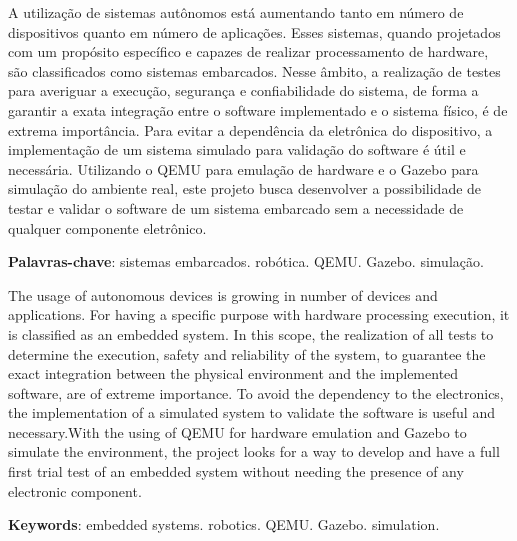\documentclass[../monografia.tex]{subfiles}
\begin{document}
    \clearpage

    {\centering   
    }
     A utilização de sistemas autônomos está aumentando tanto em número de dispositivos quanto em número de aplicações. Esses sistemas, quando projetados com um propósito específico e capazes de realizar processamento de hardware, são classificados como sistemas embarcados. Nesse âmbito, a realização de testes para averiguar a execução, segurança e confiabilidade do sistema, de forma a garantir a exata integração entre o software implementado e o sistema físico, é de extrema importância. Para evitar a dependência da eletrônica do dispositivo, a implementação de um sistema simulado para validação do software é útil e necessária. Utilizando o QEMU para emulação de hardware e o Gazebo para simulação do ambiente real, este projeto busca desenvolver a possibilidade de testar e validar o software de um sistema embarcado sem a necessidade de qualquer componente eletrônico.
    
     \textbf{Palavras-chave}: sistemas embarcados. robótica. QEMU. Gazebo. simulação.
        
    \clearpage
    
    {\centering   
    }
    \hspace{1cm} The usage of autonomous devices is growing in number of devices and applications. For having a specific purpose with hardware processing execution, it is classified as an embedded system. In this scope, the realization of all tests to determine the execution, safety and reliability of the system, to guarantee the exact integration between the physical environment  and the implemented software, are of extreme importance. To avoid the dependency to the electronics, the implementation of a simulated system to validate the software is useful and necessary.With the using of QEMU for hardware emulation and Gazebo to simulate the environment, the project looks for a way to develop and have a full first trial test of an embedded system without needing the presence of any electronic component.

   \vspace{\onelineskip}
 
   \noindent 
   \textbf{Keywords}: embedded systems. robotics. QEMU. Gazebo. simulation.
\end{document}
